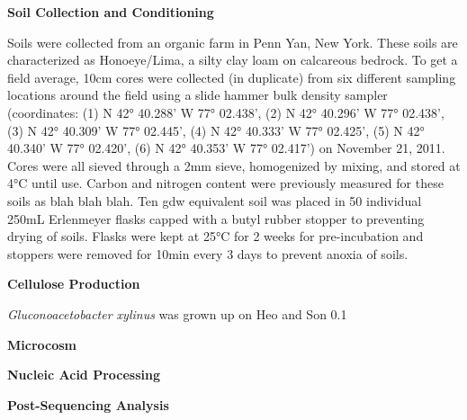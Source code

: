 \textbf{Soil Collection and Conditioning}



Soils were collected from an organic farm in Penn Yan, New York.  These soils are characterized as Honoeye/Lima, a silty clay loam on calcareous bedrock.  To get a field average, 10cm cores were collected (in duplicate) from six different sampling locations around the field using a slide hammer bulk density sampler (coordinates: (1) N 42° 40.288’ W 77° 02.438’, (2) N 42° 40.296’ W 77° 02.438’, (3) N 42° 40.309’ W 77° 02.445’, (4) N 42° 40.333’ W 77° 02.425’, (5) N 42° 40.340’ W 77° 02.420’, (6) N 42° 40.353’ W 77° 02.417’) on November 21, 2011.   Cores were all sieved through a 2mm sieve, homogenized by mixing, and stored at 4°C until use.  Carbon and nitrogen content were previously measured for these soils as blah blah blah.  Ten gdw equivalent soil was placed in 50 individual 250mL Erlenmeyer flasks capped with a butyl rubber stopper to preventing drying of soils.  Flasks were kept at 25°C for 2 weeks for pre-incubation and stoppers were removed for 10min every 3 days to prevent anoxia of soils.   



\textbf{Cellulose Production}



\textit{Gluconoacetobacter xylinus} was grown up on Heo and Son 0.1%



\textbf{Microcosm}

\textbf{Nucleic Acid Processing}

\textbf{Post-Sequencing Analysis}